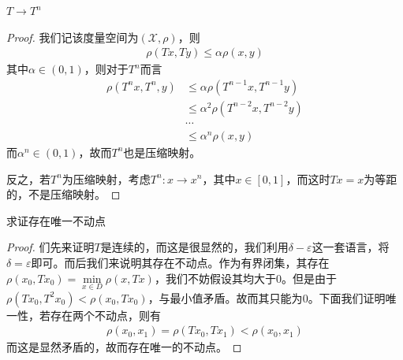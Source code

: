 \begin{exercise}
    $T\to T^n$
\end{exercise}
\begin{proof}
    我们记该度量空间为$(\mathscr{X}, \rho)$，则
    \begin{align*}
        \rho(Tx, Ty) \leqslant \alpha\rho(x, y) 
    \end{align*}
    其中$\alpha\in(0, 1)$，则对于$T^n$而言
    \begin{align*}
        \rho(T^n x, T^n, y) &\leqslant \alpha \rho(T^{n-1}x, T^{n-1}y) \\
        & \leqslant \alpha^2 \rho(T^{n-2}x, T^{n-2}y) \\
        & \cdots \\
        & \leqslant \alpha^n \rho(x, y)
    \end{align*}
    而$\alpha^n\in(0, 1)$，故而$T^n$也是压缩映射。

    反之，若$T^n$为压缩映射，考虑$T^n:x\to x^n$，其中$x\in[0, 1]$，而这时$Tx = x$为等距的，不是压缩映射。
\end{proof}

\begin{exercise}
    求证存在唯一不动点
\end{exercise}
\begin{proof}
    们先来证明$T$是连续的，而这是很显然的，我们利用$\delta - \varepsilon$这一套语言，将$\delta = \varepsilon$即可。而后我们来说明其存在不动点。作为有界闭集，其存在$\rho(x_0, Tx_0) = \min\limits_{x\in D}\rho(x, Tx)$，我们不妨假设其均大于$0$。但是由于$\rho(Tx_0, T^2x_0) < \rho(x_0, Tx_0)$，与最小值矛盾。故而其只能为$0$。下面我们证明唯一性，若存在两个不动点，则有
    \begin{align*}
        \rho(x_0, x_1) = \rho(Tx_0, Tx_1) < \rho(x_0, x_1) 
    \end{align*}
    而这是显然矛盾的，故而存在唯一的不动点。
\end{proof}

